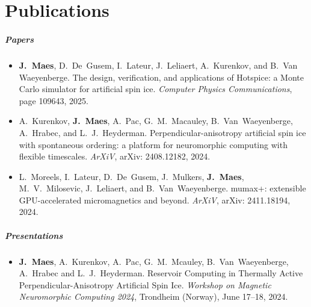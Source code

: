 \chapter{Publications}
\renewcommand{\bibitem}[1]{\item}

\paragraph*{Papers}
\begin{itemize}
    \bibitem{MAES-24}
    \textbf{J.~Maes}, D.~De~Gusem, I.~Lateur, J.~Leliaert, A.~Kurenkov, and B.~Van Waeyenberge.
    \newblock The design, verification, and applications of Hotspice: a Monte Carlo simulator for artificial spin ice.
    \newblock \emph{Computer Physics Communications}, page 109643, 2025.

    \bibitem{KUR-24}
    A.~Kurenkov, \textbf{J.~Maes}, A.~Pac, G.~M.~Macauley, B.~Van~Waeyenberge, A.~Hrabec, and L.~J.~Heyderman.
    \newblock Perpendicular-anisotropy artificial spin ice with spontaneous ordering: a platform for neuromorphic computing with flexible timescales.
    \newblock \emph{ArXiV}, arXiv: 2408.12182, 2024.

    \bibitem{MOR-24}
    L.~Moreels, I.~Lateur, D.~De~Gusem, J.~Mulkers, \textbf{J.~Maes}, M.~V.~Milosevic, J.~Leliaert, and B.~Van~Waeyenberge.
    \newblock mumax+: extensible GPU-accelerated micromagnetics and beyond.
    \newblock \emph{ArXiV}, arXiv: 2411.18194, 2024.
\end{itemize}

\paragraph*{Presentations}
\begin{itemize}
    \bibitem{SPINENGINE-24}
    \textbf{J.~Maes}, A.~Kurenkov, A.~Pac, G.~M.~Mcauley, B.~Van~Waeyenberge, A.~Hrabec and L.~J.~Heyderman.
    \newblock Reservoir Computing in Thermally Active Perpendicular-Anisotropy Artificial Spin Ice.
    \newblock \emph{Workshop on Magnetic Neuromorphic Computing 2024}, Trondheim (Norway), June 17--18, 2024.
\end{itemize}

